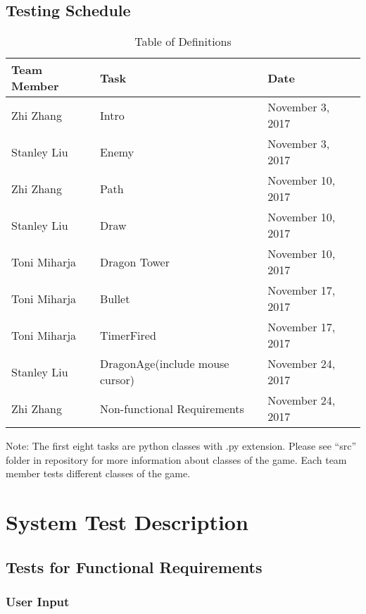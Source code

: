 \documentclass[12,english]{article}
\begin{document}
\subsection{Testing Schedule}
\begin{table}[h!]
    \centering
    \begin{tabular}{|p{3cm}|p{3cm}|p{3cm}|}
    \hline
    \textbf {Team Member} & {Task} & {Date}\\
    \hline
    Zhi Zhang & Intro & November 3, 2017\\
    \hline
    Stanley Liu & Enemy & November 3, 2017\\
    \hline
    Zhi Zhang & Path & November 10, 2017\\
    \hline
    Stanley Liu & Draw & November 10, 2017\\
    \hline
    Toni Miharja & Dragon Tower & November 10, 2017\\
    \hline
    Toni Miharja & Bullet & November 17, 2017\\
    \hline
    Toni Miharja & TimerFired & November 17, 2017\\
    \hline
    Stanley Liu & DragonAge(include mouse cursor) & November 24, 2017\\
    \hline
    Zhi Zhang & Non-functional Requirements & November 24, 2017\\
    \hline
    \end{tabular}
    \caption{Table of Definitions}
\end{table}

Note: The first eight tasks are python classes with .py extension. Please see “src” folder in repository for more information about classes of the game. Each team member tests different classes of the game.

\section{System Test Description}
\subsection{Tests for Functional Requirements}
\subsubsection{User Input}
\end{document}
